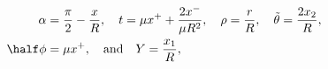 \begin{equation}
\begin{aligned}
 \alpha & = \frac{\pi}{2} - \frac{x}{R},\quad
t = \mu x^+ + \frac{2 x^-}{\mu R^2}, \quad
\rho = \frac{r}{R}, \quad
\tilde{\theta} = \frac{2 x_2}{R}, \quad    \\
 \half \phi & =  \mu x^+ , \quad
\textrm{and} \quad Y = \frac{x_1}{R},
\end{aligned}
\end{equation}

